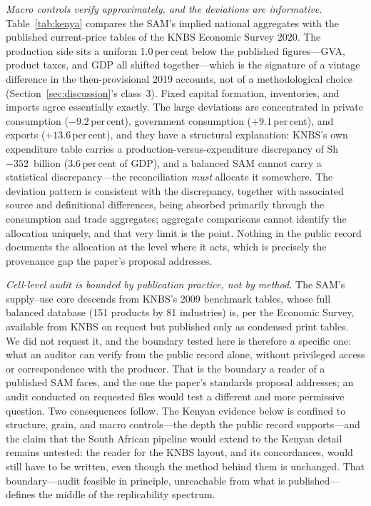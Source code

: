 \emph{Macro controls verify approximately, and the deviations are
informative.} Table~\ref{tab:kenya} compares the SAM's implied national
aggregates with the published current-price tables of the KNBS Economic
Survey 2020. The production side sits a uniform 1.0\,per\,cent below the
published figures---GVA, product taxes, and GDP all shifted
together---which is the signature of a vintage difference in the
then-provisional 2019 accounts, not of a methodological choice
(Section~\ref{sec:discussion}'s class~3). Fixed capital formation,
inventories, and imports agree essentially exactly. The large deviations
are concentrated in private consumption ($-9.2$\,per\,cent), government
consumption ($+9.1$\,per\,cent), and exports ($+13.6$\,per\,cent), and
they have a structural explanation: KNBS's own expenditure table carries a
production-versus-expenditure discrepancy of Sh~$-352$~billion
(3.6\,per\,cent of GDP), and a balanced SAM cannot carry a statistical
discrepancy---the reconciliation \emph{must} allocate it somewhere. The
deviation pattern is consistent with the discrepancy, together with
associated source and definitional differences, being absorbed primarily
through the consumption and trade aggregates; aggregate comparisons
cannot identify the allocation uniquely, and that very limit is the
point. Nothing in the public record documents the allocation at the
level where it acts, which is precisely the provenance gap the paper's
proposal addresses.

\begin{table}[t]
\centering\small
\caption{Kenya: the IFPRI 2019 Nexus SAM against published KNBS controls
(Sh billion, current prices; Economic Survey 2020, Tables 2.1 and 2.7,
2019 provisional).}
\label{tab:kenya}

\end{table}

\emph{Cell-level audit is bounded by publication practice, not by
method.} The SAM's supply--use core descends from KNBS's 2009 benchmark
tables, whose full balanced database (151 products by 81 industries) is,
per the Economic Survey, available from KNBS on request but published only
as condensed print tables. We did not request it, and the boundary tested
here is therefore a specific one: what an auditor can verify from the
public record alone, without privileged access or correspondence with the
producer. That is the boundary a reader of a published SAM faces, and the
one the paper's standards proposal addresses; an audit conducted on
requested files would test a different and more permissive question. Two
consequences follow. The Kenyan evidence below is confined to structure,
grain, and macro controls---the depth the public record supports---and the
claim that the South African pipeline would extend to the Kenyan detail
remains untested: the reader for the KNBS layout, and its concordances,
would still have to be written, even though the method behind them is
unchanged. That boundary---audit feasible in principle, unreachable from
what is published---defines the middle of the replicability spectrum.

